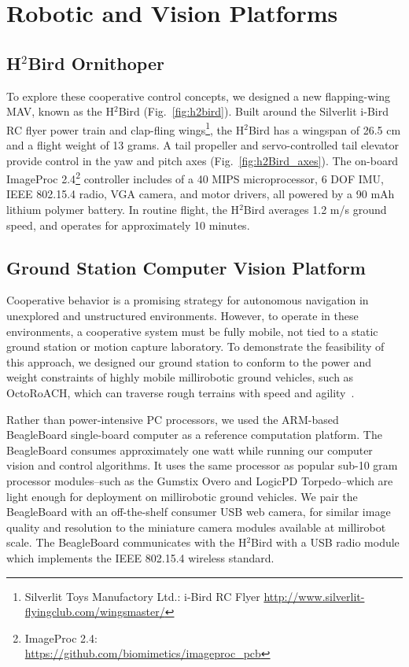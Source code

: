 \documentclass{aamas2013}
\begin{document}
\section{Robotic and Vision Platforms}
\subsection{H$^2$Bird Ornithoper}
To explore these cooperative control concepts, we designed a new 
flapping-wing MAV, known as the H$^2$Bird (Fig.~\ref{fig:h2bird}). Built 
around the Silverlit i-Bird RC flyer power train and clap-fling wings\footnote{\raggedright Silverlit Toys Manufactory Ltd.: i-Bird RC Flyer
\href{http://www.silverlit-flyingclub.com/wingsmaster/}
     {http://www.silverlit-flyingclub.com/wingsmaster/}}, 
the H$^2$Bird has a wingspan of 26.5 cm and a flight weight of 13 grams. A 
tail propeller and servo-controlled tail elevator provide control in the yaw 
and pitch axes (Fig.~\ref{fig:h2Bird_axes}). The on-board ImageProc 2.4\footnote{ImageProc 2.4: \\
\href{https://github.com/biomimetics/imageproc\_pcb}
     {https://github.com/biomimetics/imageproc\_pcb}} 
controller includes of a 40 MIPS microprocessor, 6 DOF IMU, 
IEEE 802.15.4 radio, VGA camera, and motor drivers, all powered by a 90 mAh 
lithium polymer battery. In routine flight, the H$^2$Bird averages 1.2 m/s 
ground speed, and operates for approximately 10 minutes.

\subsection{Ground Station Computer Vision Platform}
Cooperative behavior is a promising strategy for autonomous navigation in 
unexplored and unstructured environments. However, to operate in these 
environments, a cooperative system must be fully mobile, not tied to a 
static ground station or motion capture laboratory. To demonstrate the 
feasibility of this approach, we designed our ground station to conform to 
the power and weight constraints of highly mobile millirobotic ground 
vehicles, such as OctoRoACH, which can traverse rough terrains with speed and 
agility~\cite{Pullin2012Dynamic}. 

Rather than power-intensive PC processors, we used the ARM-based BeagleBoard 
single-board computer as a reference computation platform. The BeagleBoard 
consumes approximately one watt while running our computer vision and 
control algorithms. It uses the same processor as popular sub-10 gram 
processor modules--such as the Gumstix Overo and LogicPD Torpedo--which are 
light enough for deployment on millirobotic ground vehicles. We pair the 
BeagleBoard with an off-the-shelf consumer USB web camera, for similar image 
quality and resolution to the miniature camera modules available at 
millirobot scale. The BeagleBoard communicates with the H$^2$Bird with a 
USB radio module which implements the IEEE 802.15.4 wireless standard.
\end{document}
